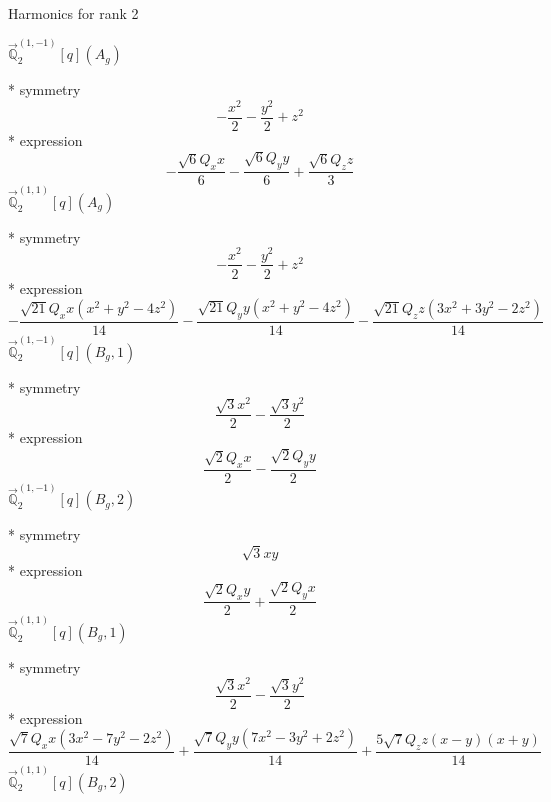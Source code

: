 \documentclass[fleqn,8pt]{jsarticle}
\begin{document}
\noindent * Harmonics for rank 2

\noindent\quad $\vec{\mathbb{Q}}_{2}^{(1,-1)}[q](A_{g})$

\noindent\quad ** symmetry
\begin{dmath*}
- \frac{x^{2}}{2} - \frac{y^{2}}{2} + z^{2}
\end{dmath*}
\noindent\quad ** expression
\begin{dmath*}
- \frac{\sqrt{6} Q_{x} x}{6} - \frac{\sqrt{6} Q_{y} y}{6} + \frac{\sqrt{6} Q_{z} z}{3}
\end{dmath*}
\noindent\quad $\vec{\mathbb{Q}}_{2}^{(1,1)}[q](A_{g})$

\noindent\quad ** symmetry
\begin{dmath*}
- \frac{x^{2}}{2} - \frac{y^{2}}{2} + z^{2}
\end{dmath*}
\noindent\quad ** expression
\begin{dmath*}
- \frac{\sqrt{21} Q_{x} x \left(x^{2} + y^{2} - 4 z^{2}\right)}{14} - \frac{\sqrt{21} Q_{y} y \left(x^{2} + y^{2} - 4 z^{2}\right)}{14} - \frac{\sqrt{21} Q_{z} z \left(3 x^{2} + 3 y^{2} - 2 z^{2}\right)}{14}
\end{dmath*}
\noindent\quad $\vec{\mathbb{Q}}_{2}^{(1,-1)}[q](B_{g},1)$

\noindent\quad ** symmetry
\begin{dmath*}
\frac{\sqrt{3} x^{2}}{2} - \frac{\sqrt{3} y^{2}}{2}
\end{dmath*}
\noindent\quad ** expression
\begin{dmath*}
\frac{\sqrt{2} Q_{x} x}{2} - \frac{\sqrt{2} Q_{y} y}{2}
\end{dmath*}
\noindent\quad $\vec{\mathbb{Q}}_{2}^{(1,-1)}[q](B_{g},2)$

\noindent\quad ** symmetry
\begin{dmath*}
\sqrt{3} x y
\end{dmath*}
\noindent\quad ** expression
\begin{dmath*}
\frac{\sqrt{2} Q_{x} y}{2} + \frac{\sqrt{2} Q_{y} x}{2}
\end{dmath*}
\noindent\quad $\vec{\mathbb{Q}}_{2}^{(1,1)}[q](B_{g},1)$

\noindent\quad ** symmetry
\begin{dmath*}
\frac{\sqrt{3} x^{2}}{2} - \frac{\sqrt{3} y^{2}}{2}
\end{dmath*}
\noindent\quad ** expression
\begin{dmath*}
\frac{\sqrt{7} Q_{x} x \left(3 x^{2} - 7 y^{2} - 2 z^{2}\right)}{14} + \frac{\sqrt{7} Q_{y} y \left(7 x^{2} - 3 y^{2} + 2 z^{2}\right)}{14} + \frac{5 \sqrt{7} Q_{z} z \left(x - y\right) \left(x + y\right)}{14}
\end{dmath*}
\noindent\quad $\vec{\mathbb{Q}}_{2}^{(1,1)}[q](B_{g},2)$
\end{document}
